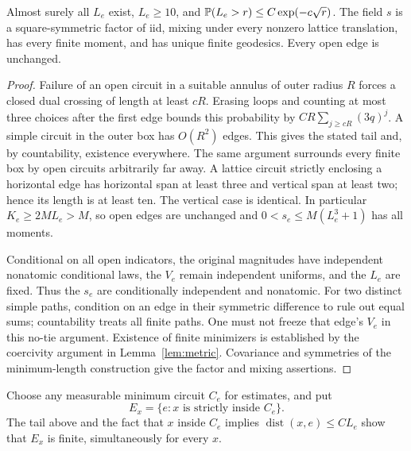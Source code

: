 \begin{lemma}\label{lem:capfacts}
Almost surely all $L_e$ exist, $L_e\ge10$, and
$\mathbb P(L_e>r)\le C\exp(-c\sqrt r)$. The field $s$ is a square-symmetric
factor of iid, mixing under every nonzero lattice translation, has every
finite moment, and has unique finite geodesics. Every open edge is unchanged.
\end{lemma}
\begin{proof}
Failure of an open circuit in a suitable annulus of outer radius $R$ forces
a closed dual crossing of length at least $cR$. Erasing loops and counting
at most three choices after the first edge bounds this probability by
$CR\sum_{j\ge cR}(3q)^j$. A simple circuit in the outer box has $O(R^2)$
edges. This gives the stated tail and, by countability, existence everywhere.
The same argument surrounds every finite box by open circuits arbitrarily
far away. A lattice circuit strictly enclosing a horizontal edge has
horizontal span at least three and vertical span at least two; hence its
length is at least ten. The vertical case is identical. In particular
$K_e\ge2ML_e>M$, so open edges are unchanged and
$0<s_e\le M(L_e^3+1)$ has all moments.

Conditional on all open indicators, the original magnitudes have independent
nonatomic conditional laws, the $V_e$ remain independent uniforms, and the
$L_e$ are fixed. Thus the $s_e$ are conditionally independent and nonatomic.
For two distinct simple paths, condition on an edge in their symmetric
difference to rule out equal sums; countability treats all finite paths.
One must not freeze that edge's $V_e$ in this no-tie argument. Existence of
finite minimizers is established by the coercivity argument in
Lemma~\ref{lem:metric}. Covariance and symmetries of the minimum-length
construction give the factor and mixing assertions.
\end{proof}

Choose any measurable minimum circuit $C_e$ for estimates, and put
\[E_x=\{e:x\text{ is strictly inside }C_e\}.\] The tail above and the fact
that $x$ inside $C_e$ implies $\operatorname{dist}(x,e)\le C L_e$ show
that $E_x$ is finite, simultaneously for every $x$.

